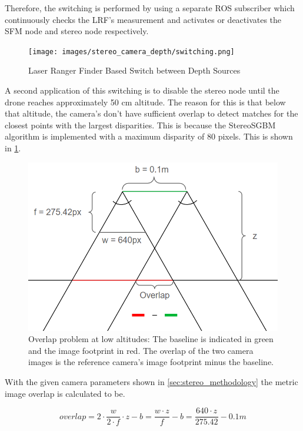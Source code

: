 Therefore, the switching is performed by using a separate ROS subscriber which continuously checks the LRF's measurement and activates or deactivates the SFM node and stereo node respectively.

\begin{figure}[h]
    \centering
    \texttt{[image: images/stereo\_camera\_depth/switching.png]}
    \caption{Laser Ranger Finder Based Switch between Depth Sources}
\end{figure}

A second application of this switching is to disable the stereo node until the drone reaches approximately 50 cm altitude. The reason for this is that below that altitude, the camera's don't have sufficient overlap to detect matches for the closest points with the largest disparities. This is because the StereoSGBM algorithm is implemented with a maximum disparity of 80 pixels. This is shown in \cref{fig:overlap}.

\begin{figure}[h]
    \centering
    \includegraphics[scale=0.17]{images/stereo_camera_depth/overlap.png}
    \caption{Overlap problem at low altitudes: The baseline is indicated in green and the image footprint in red. The overlap of the two camera images is the reference camera's image footprint minus the baseline.}
    \label{fig:overlap}
\end{figure}

With the given camera parameters shown in \cref{sec:stereo_methodology} the metric image overlap is calculated to be.

\begin{equation}
    overlap = 2 \cdot \frac{w}{2\cdot f} \cdot z - b = \frac{w\cdot z}{f} - b = \frac{640\cdot z}{275.42} - 0.1 m
    \label{eq:overlap}
\end{equation}


